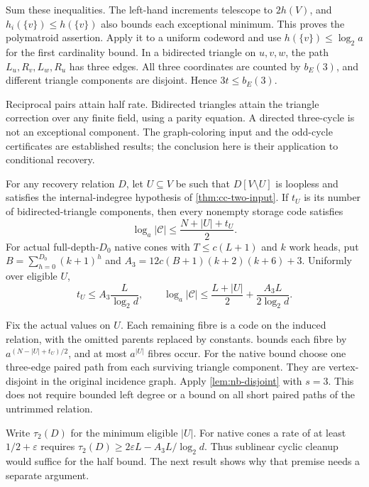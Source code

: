 \begin{informalproof}
Sum these inequalities. The left-hand increments telescope to $2h(V)$,
and $h_i(\{v\})\le h(\{v\})$ also bounds each exceptional minimum.
This proves the polymatroid assertion. Apply it to a uniform codeword
and use $h(\{v\})\le\log_2 a$ for the first cardinality bound.
In a bidirected triangle on $u,v,w$, the path
$L_u,R_v,L_w,R_u$ has three edges. All three coordinates are counted
by $b_E(3)$, and different triangle components are disjoint. Hence
$3t\le b_E(3)$.
\end{informalproof}

Reciprocal pairs attain half rate. Bidirected triangles attain the
triangle correction over any finite field, using a parity equation.
A directed three-cycle is not an exceptional component.
The graph-coloring input and the odd-cycle certificates are established
results; the conclusion here is their application to conditional recovery.

\begin{corollary}\label{cor:cc-cleanup}
\notformalized
For any recovery relation $D$, let $U\subseteq V$ be such that $D[V\setminus U]$
is loopless and satisfies the internal-indegree hypothesis of
\cref{thm:cc-two-input}. If $t_U$ is its number of bidirected-triangle
components, then every nonempty storage code satisfies
\[
 \log_a|\mathcal C|\le\frac{N+|U|+t_U}{2}.
\]
For actual full-depth-$D_0$ native cones with $T\le c(L+1)$ and $k$ work
heads, put $B=\sum_{h=0}^{D_0}(k+1)^h$ and
$A_3=12c(B+1)(k+2)(k+6)+3$. Uniformly over eligible $U$,
\[
 t_U\le A_3\frac L{\log_2 d},\qquad
 \log_a|\mathcal C|\le\frac{L+|U|}{2}
                      +\frac{A_3L}{2\log_2 d}.
\]
\end{corollary}
\begin{informalproof}
Fix the actual values on $U$. Each remaining fibre is a code on the
induced relation, with the omitted parents replaced by constants.
 bounds each fibre by
$a^{(N-|U|+t_U)/2}$, and at most $a^{|U|}$ fibres occur.
For the native bound choose one three-edge paired path from each
surviving triangle component. They are vertex-disjoint in the original
incidence graph. Apply \cref{lem:nb-disjoint} with $s=3$.
This does not require bounded left degree or a bound on all short
paired paths of the untrimmed relation.
\end{informalproof}

Write $\tau_2(D)$ for the minimum eligible $|U|$. For native cones a
rate of at least $1/2+\varepsilon$ requires
$\tau_2(D)\ge2\varepsilon L-A_3L/\log_2d$.
Thus sublinear cyclic cleanup would suffice for the half bound.
The next result shows why that premise needs a separate argument.

